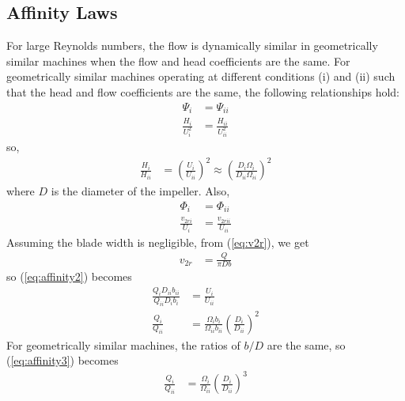\subsection{Affinity Laws}
For large Reynolds numbers, the flow is dynamically similar in geometrically similar machines when the flow and head coefficients are the same. For geometrically similar machines operating at different conditions (i) and (ii) such that the head and flow coefficients are the same, the following relationships hold:
\begin{align*}
    \Psi_i &= \Psi_{ii}  \\
    \frac{H_i}{U_i^2} &= \frac{H_{ii}}{U_{ii}^2} 
\end{align*}
so,
\begin{align}
    \frac{H_i}{H_{ii}} &= \left(\frac{U_i}{U_{ii}}\right)^2 \approx \left(\frac{D_i \Omega_i}{D_{ii} \Omega_{ii}}\right)^2 \label{eq:affinity1}
\end{align}
where $D$ is the diameter of the impeller. Also,
\begin{align}
    \Phi_i &= \Phi_{ii}  \nonumber \\
    \frac{v_{2ri}}{U_i} &= \frac{v_{2rii}}{U_{ii}} \label{eq:affinity2}
\end{align}
Assuming the blade width is negligible, from (\ref{eq:v2r}), we get
\begin{align}
    v_{2r} &= \frac{Q}{\pi D b}
\end{align}
so (\ref{eq:affinity2}) becomes
\begin{align}
    \frac{Q_i D_{ii} b_{ii}}{Q_{ii} D_i b_i} &= \frac{U_i}{U_{ii}} \nonumber \\
    \frac{Q_i}{Q_{ii}} &= \frac{\Omega_i b_i}{\Omega_{ii} b_{ii}} \left(\frac{D_{i}}{D_{ii}}\right)^2 \label{eq:affinity3}
\end{align}
For geometrically similar machines, the ratios of $b/D$ are the same, so (\ref{eq:affinity3}) becomes
\begin{align}
    \frac{Q_i}{Q_{ii}} &= \frac{\Omega_i}{\Omega_{ii}} \left(\frac{D_{i}}{D_{ii}}\right)^3 \label{eq:affinity_law_for_flow}
\end{align}

